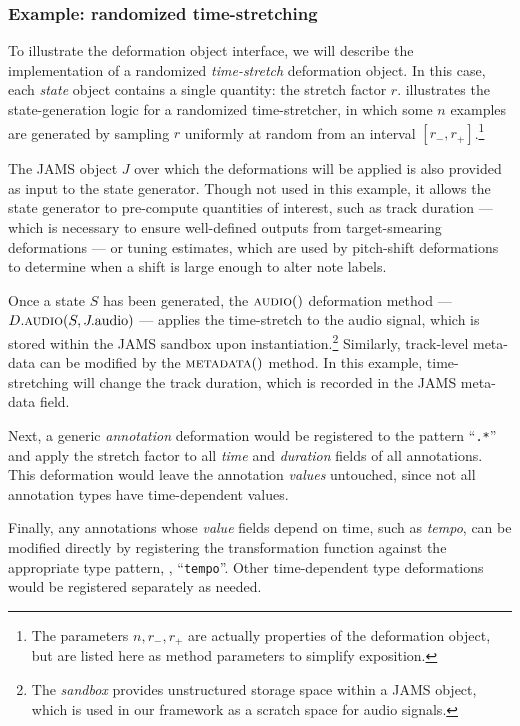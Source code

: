 \documentclass{article}
\begin{document}
\subsubsection{Example: randomized time-stretching}
\label{deformer-example}
To illustrate the deformation object interface, we will describe the implementation of a 
randomized \emph{time-stretch} deformation object.
In this case, each \emph{state} object contains a single quantity: the stretch factor $r$.
 illustrates the state-generation logic for a randomized
time-stretcher, in which some $n$ examples are generated by sampling $r$ uniformly at
random from an interval $[r_-, r_+]$.\footnote{The parameters $n, r_-, r_+$ are actually
    properties of the deformation object, but are listed here as method parameters to
simplify exposition.}

The JAMS object $J$ over which the deformations will be applied is also provided as input 
to the state generator.  Though not used in this example, it allows the state generator
to pre-compute quantities of interest, such as track duration 
 --- which is necessary to ensure well-defined outputs from target-smearing deformations --- 
or tuning estimates, which are used by pitch-shift deformations to 
determine when a shift is large enough to 
alter note labels.

Once a state $S$ has been generated, the $\Call{audio}$ deformation method
--- $D.\Call{audio}{S, J.\text{audio}}$ --- 
applies the time-stretch to the audio signal, which is stored within the
JAMS sandbox upon instantiation.\footnote{The \emph{sandbox} provides unstructured
storage space within a JAMS object, which is used in our framework as a scratch space for
audio signals.}  Similarly, track-level meta-data can be modified by the $\Call{metadata}$
method.  In this example, time-stretching will change the track duration, which is recorded
in the JAMS meta-data field.

Next, a generic \emph{annotation} deformation would be registered to the pattern
``\texttt{.*}'' and apply the stretch factor to all \emph{time} and \emph{duration}
fields of all annotations.  This deformation would leave the annotation
\emph{values} untouched, since not all annotation types have time-dependent values.

Finally, any annotations whose \emph{value} fields depend on time, such as \emph{tempo},
can be modified directly by registering the transformation function against the
appropriate type pattern, \eg, ``\texttt{tempo}''.  Other time-dependent type
deformations would be registered separately as needed.
\end{document}

